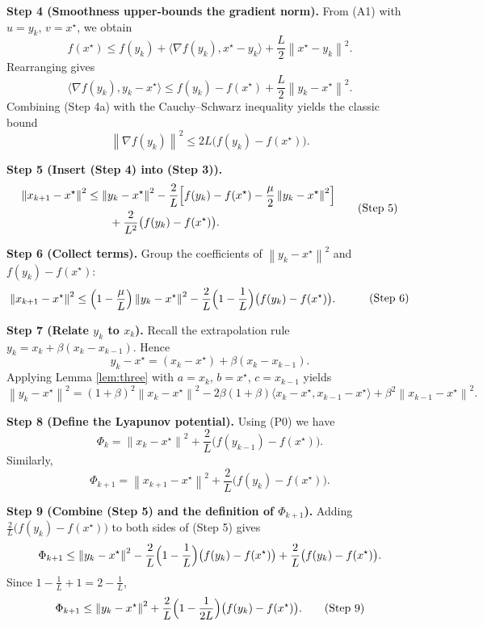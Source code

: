 \documentclass{article}
\newcommand{\norm}[1]{\left\|#1\right\|}
\newcommand{\ip}[2]{\langle #1,#2\rangle}
\begin{document}
\noindent\textbf{Step 4 (Smoothness upper‑bounds the gradient norm).}
From (A1) with $u=y_k$, $v=x^\star$, we obtain
\[
f(x^\star)\le f(y_k)+\ip{\nabla f(y_k)}{x^\star-y_k}+\frac{L}{2}\norm{x^\star-y_k}^2 .
\]
Rearranging gives
\[
\ip{\nabla f(y_k)}{y_k-x^\star}\le f(y_k)-f(x^\star)+\frac{L}{2}\norm{y_k-x^\star}^2 .
\tag{Step 4a}
\]
Combining (Step 4a) with the Cauchy–Schwarz inequality yields the classic bound
\[
\norm{\nabla f(y_k)}^2 \le 2L\bigl(f(y_k)-f(x^\star)\bigr) .
\tag{Step 4}
\]

\noindent\textbf{Step 5 (Insert (Step 4) into (Step 3)).}
\[
\begin{aligned}
\norm{x_{k+1}-x^\star}^2
&\le \norm{y_k-x^\star}^2 
   -\frac{2}{L}\Bigl[f(y_k)-f(x^\star)-\frac{\mu}{2}\norm{y_k-x^\star}^2\Bigr] \\
&\qquad +\frac{2}{L^2}\bigl(f(y_k)-f(x^\star)\bigr) .
\end{aligned}
\tag{Step 5}
\]

\noindent\textbf{Step 6 (Collect terms).}
Group the coefficients of $\norm{y_k-x^\star}^2$ and $f(y_k)-f(x^\star)$:
\[
\begin{aligned}
\norm{x_{k+1}-x^\star}^2
&\le \Bigl(1-\frac{\mu}{L}\Bigr)\norm{y_k-x^\star}^2 
   -\frac{2}{L}\Bigl(1-\frac{1}{L}\Bigr)\bigl(f(y_k)-f(x^\star)\bigr) .
\end{aligned}
\tag{Step 6}
\]

\noindent\textbf{Step 7 (Relate $y_k$ to $x_k$).}
Recall the extrapolation rule $y_k = x_k + \beta (x_k-x_{k-1})$. Hence
\[
y_k - x^\star = (x_k-x^\star) + \beta (x_k-x_{k-1}) .
\tag{Step 7}
\]
Applying Lemma \ref{lem:three} with $a=x_k$, $b=x^\star$, $c=x_{k-1}$ yields
\[
\norm{y_k-x^\star}^2 = (1+\beta)^2\norm{x_k-x^\star}^2 -2\beta(1+\beta)\ip{x_k-x^\star}{x_{k-1}-x^\star}
      +\beta^2\norm{x_{k-1}-x^\star}^2 .
\tag{Step 7a}
\]

\noindent\textbf{Step 8 (Define the Lyapunov potential).}
Using (P0) we have
\[
\Phi_k = \norm{x_k-x^\star}^2 + \frac{2}{L}\bigl(f(y_{k-1})-f(x^\star)\bigr) .
\tag{Step 8}
\]
Similarly,
\[
\Phi_{k+1}= \norm{x_{k+1}-x^\star}^2 + \frac{2}{L}\bigl(f(y_{k})-f(x^\star)\bigr) .
\tag{Step 8a}
\]

\noindent\textbf{Step 9 (Combine (Step 5) and the definition of $\Phi_{k+1}$).}
Adding $\frac{2}{L}\bigl(f(y_{k})-f(x^\star)\bigr)$ to both sides of (Step 5) gives
\[
\Phi_{k+1}\le \norm{y_k-x^\star}^2 -\frac{2}{L}\Bigl(1-\frac{1}{L}\Bigr)\bigl(f(y_k)-f(x^\star)\bigr)
               +\frac{2}{L}\bigl(f(y_k)-f(x^\star)\bigr) .
\]
Since $1-\frac{1}{L}+1 = 2-\frac{1}{L}$,
\[
\Phi_{k+1}\le \norm{y_k-x^\star}^2 + \frac{2}{L}\Bigl(1-\frac{1}{2L}\Bigr)\bigl(f(y_k)-f(x^\star)\bigr) .
\tag{Step 9}
\]
\end{document}
